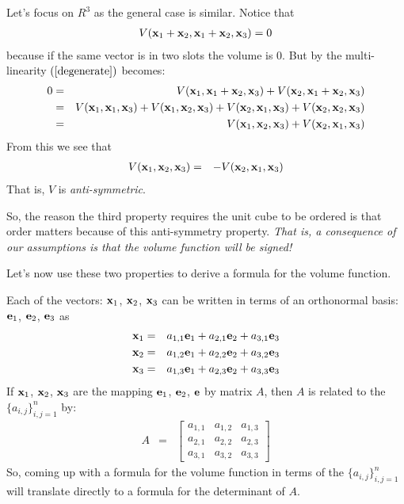 \documentclass{article}
\begin{document}
Let's focus on $R^3$ as the general case is similar. Notice that
\begin{eqnarray}
  V({\bf x}_1 + {\bf x}_2, {\bf x}_1 + {\bf x}_2, {\bf x}_3) = 0 \label{degenerate}
\end{eqnarray}
because if the same vector is in two slots the volume is $0$.
But by the multi-linearity $(\ref{degenerate})$ becomes:
\begin{eqnarray}
  0 & = & V({\bf x}_1, {\bf x}_1 + {\bf x}_2, {\bf x}_3)
      +  V({\bf x}_2, {\bf x}_1 + {\bf x}_2, {\bf x}_3) \nonumber \\
    & = & V({\bf x}_1, {\bf x}_1 , {\bf x}_3)
          + V({\bf x}_1, {\bf x}_2, {\bf x}_3)
          +  V({\bf x}_2, {\bf x}_1, {\bf x}_3)
          + V({\bf x}_2, {\bf x}_2, {\bf x}_3) \nonumber \\
  & = & V({\bf x}_1, {\bf x}_2, {\bf x}_3) + V({\bf x}_2, {\bf x}_1, {\bf x}_3)
\end{eqnarray}
From this we see that 
\begin{eqnarray}
  V({\bf x}_1, {\bf x}_2, {\bf x}_3)  & = & - V({\bf x}_2, {\bf x}_1, {\bf x}_3)
\end{eqnarray}
That is, $V$ is {\em anti-symmetric\/}.


So, the reason the third property requires the unit cube to be ordered
is that order matters because of this anti-symmetry property. {\em That is,
a consequence of our assumptions is that the volume function will be
signed!\/}

Let's now use these two properties to derive a formula for the volume
function.

Each of the vectors: ${\bf x}_1$, ${\bf x}_2$, ${\bf x}_3$ can be written in
terms of an orthonormal basis: ${\bf e}_1$, ${\bf e}_2$, ${\bf e}_3$ as
\begin{eqnarray*}
  {\bf x}_1 & = & a_{1,1} {\bf e}_1 + a_{2,1} {\bf e}_2 + a_{3,1} {\bf e}_3 \\
  {\bf x}_2 & = & a_{1,2} {\bf e}_1 + a_{2,2} {\bf e}_2 + a_{3,2} {\bf e}_3 \\
  {\bf x}_3 & = & a_{1,3} {\bf e}_1 + a_{2,3} {\bf e}_2 + a_{3,3} {\bf e}_3 \\
\end{eqnarray*}
If ${\bf x}_1$, ${\bf x}_2$, ${\bf x}_3$ are the mapping
${\bf e}_1$, ${\bf e}_2$, ${\bf e}$ by matrix $A$, then $A$ is related to the
$\{a_{i,j}\}_{i,j=1}^n$ by:
\begin{eqnarray}
  A & = & \left[ \begin{array}{ccc}
                   a_{1,1} & a_{1, 2} & a_{1,3} \\
                   a_{2,1} & a_{2, 2} & a_{2,3} \\
                   a_{3,1} & a_{3, 2} & a_{3,3}
                 \end{array} \right]
\end{eqnarray}
So, coming up with a formula for the volume function in terms of the
$\{a_{i,j}\}_{i,j=1}^n$ will
translate directly to a formula for the determinant of $A$.
\end{document}
